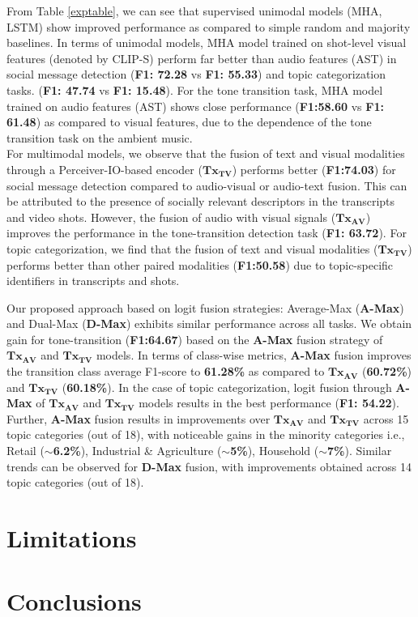 From Table \ref{exptable}, we can see that supervised unimodal models (MHA, LSTM) show improved performance as compared to simple random and majority baselines. In terms of unimodal models, MHA model trained on shot-level visual features (denoted by CLIP-S) perform far better than audio features (AST) in social message detection (\textbf{F1: 72.28} vs \textbf{F1: 55.33}) and topic categorization tasks.
(\textbf{F1: 47.74} vs \textbf{F1: 15.48}). For the tone transition task, MHA model trained on audio features (AST) shows close performance (\textbf{F1:58.60} vs \textbf{F1: 61.48}) as compared to visual features, due to the dependence of the tone transition task on the ambient music. \\
For multimodal models, we observe that the fusion of text and visual modalities through a Perceiver-IO-based encoder ($\mathbf{Tx_{TV}}$) performs better (\textbf{F1:74.03}) for social message detection compared to audio-visual or audio-text fusion. This can be attributed to the presence of socially relevant descriptors in the transcripts and video shots. However, the fusion of audio with visual signals ($\mathbf{Tx_{AV}}$) improves the performance in the tone-transition detection task (\textbf{F1: 63.72}). For topic categorization, we find that the fusion of text and visual modalities ($\mathbf{Tx_{TV}}$) performs better than other paired modalities (\textbf{F1:50.58}) due to topic-specific identifiers in transcripts and shots. 
\par
 Our proposed approach based on logit fusion strategies: Average-Max (\textbf{A-Max}) and Dual-Max (\textbf{D-Max}) exhibits similar performance across all tasks. We obtain gain for tone-transition (\textbf{F1:64.67}) based on the \textbf{A-Max} fusion strategy of $\mathbf{Tx_{AV}}$ and $\mathbf{Tx_{TV}}$ models. In terms of class-wise metrics, \textbf{A-Max} fusion improves the transition class average F1-score to \textbf{61.28\%} as compared to $\mathbf{Tx_{AV}}$ (\textbf{60.72\%}) and $\mathbf{Tx_{TV}}$ (\textbf{60.18\%}). In the case of topic categorization, logit fusion through \textbf{A-Max} of $\mathbf{Tx_{AV}}$ and $\mathbf{Tx_{TV}}$ models results in the best performance (\textbf{F1: 54.22}). Further, \textbf{A-Max} fusion results in improvements over $\mathbf{Tx_{AV}}$ and $\mathbf{Tx_{TV}}$ across 15 topic categories (out of 18), with noticeable gains in the minority categories i.e., Retail ($\sim${\textbf{6.2\%}}), Industrial \& Agriculture ($\sim$\textbf{5\%}), Household ($\sim$\textbf{7\%}). Similar trends can be observed for \textbf{D-Max} fusion, with improvements obtained across 14 topic categories (out of 18).

\section{Limitations}
\section{Conclusions}





